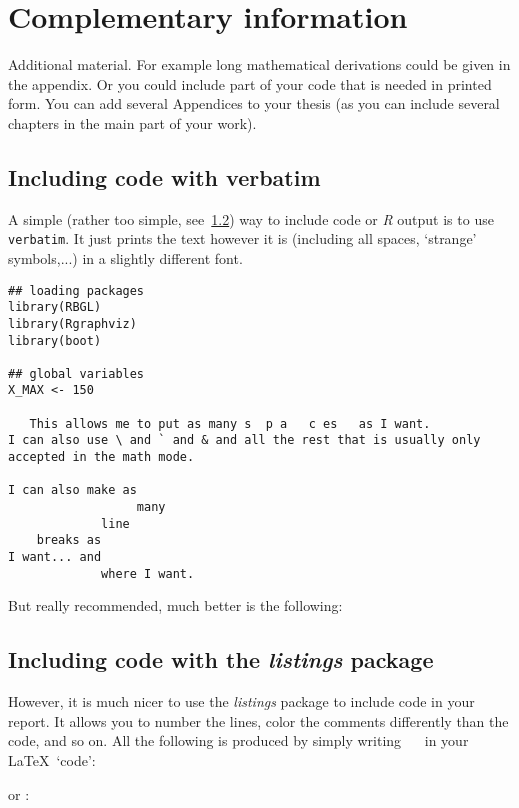 \chapter{Complementary information}
\label{app:complement}

Additional material. For example long mathematical derivations could be
given in the appendix. Or you could include part of your code that is
needed in printed form. You can add several Appendices to your thesis (as
you can include several chapters in the main part of your work).

\section{Including \Rp code with verbatim}
A simple (rather too simple, see~\ref{App:listings}) way to include code or
  {\it R} output is to use
\texttt{verbatim}. It just prints the text however it is (including all
spaces, `strange' symbols,...) in a slightly different font.
\begin{verbatim}
## loading packages
library(RBGL)
library(Rgraphviz)
library(boot)

## global variables
X_MAX <- 150

   This allows me to put as many s  p a   c es   as I want.
I can also use \ and ` and & and all the rest that is usually only 
accepted in the math mode.

I can also make as 
                  many 
             line 
    breaks as 
I want... and
             where I want. 
\end{verbatim}

But really recommended,  much better is the following:

\section{Including \Rp code with the \emph{listings} package}\label{App:listings}
However, it is much nicer to use the \emph{listings} package to include \Rp
code in your report. It allows you to number the lines, color the comments
differently than the code, and so on.
All the following is produced by simply writing
\verb!  !  in your \LaTeX\ `code':



or \verb!! :


